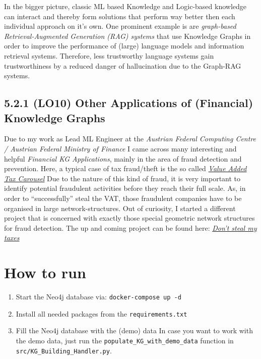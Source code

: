 \documentclass[
]{article}
\providecommand{\tightlist}{%
  \setlength{\itemsep}{0pt}\setlength{\parskip}{0pt}}
\begin{document}
In the bigger picture, classic ML based Knowledge and Logic-based
knowledge can interact and thereby form solutions that perform way
better then each individual approach on it's own. One prominent example
is are \emph{graph-based Retrieval-Augmented Generation (RAG) systems}
that use Knowledge Graphs in order to improve the performance of (large)
language models and information retrieval systems. Therefore, less
trustworthy language systems gain trustworthiness by a reduced danger of
hallucination due to the Graph-RAG systems.

\subsection{5.2.1 (LO10) Other Applications of (Financial) Knowledge
Graphs}\label{other-applications-of-financial-knowledge-graphs}

Due to my work as Lead ML Engineer at the \emph{Austrian Federal Computing Centre /  Austrian Federal
Ministry of Finance} I came across many interesting and helpful
\emph{Financial KG Applications}, mainly in the area of fraud detection
and prevention. Here, a typical case of tax fraud/theft is the so called \href{https://www.billit.eu/en-int/resources/blog/what-is-a-vat-carousel}{\textit{Value Added Tax Carousel}}
Due to the nature of this kind of fraud, it is very important to
identify potential fraudulent activities before they reach their full
scale. As, in order to ``successfully'' steal the VAT, those fraudulent
companies have to be organised in large network-structures. Out of
curiosity, I started a different project that is concerned with exactly
those special geometric network structures for fraud detection. The up
and coming project can be found here: 
\href{https://github.com/dominik-pichler/Dont\_steal\_my\_taxes}{\textit{Don't steal my taxes}}

\pagebreak
\section{How to run}\label{how-to-use}

\begin{enumerate}
\def\labelenumi{\arabic{enumi}.}
\tightlist
\item
  Start the Neo4j database via:
\texttt{docker{-}compose up {-}d}

\item
  Install all needed packages from the \texttt{requirements.txt}
\item
  Fill the Neo4j database with the (demo) data In case you want to work
  with the demo data, just run the
\texttt{populate\_KG\_with\_demo\_data} function in
  \texttt{src/KG\_Building\_Handler.py}.
\end{enumerate}
\end{document}
